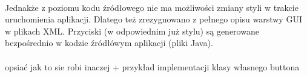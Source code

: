 \paragraph{}
Jednakże z poziomu kodu źródłowego nie ma możliwości zmiany styli w trakcie uruchomienia aplikacji.  Dlatego też zrezygnowano z pełnego opisu warstwy GUI w plikach XML. Przyciski (w odpowiednim już stylu) są generowane bezpośrednio w kodzie źródłówym aplikacji (pliki Java). 
\paragraph{}
{\color{red}opsiać jak to sie robi inaczej + przykład implementacji klasy własnego buttona}
